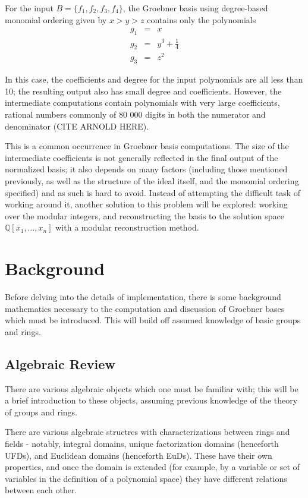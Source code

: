 \documentclass[letterpaper,12pt,titlepage,oneside,final]{book}
\begin{document}
For the input ${B = \{f_1, f_2, f_3, f_4\}}$, the Groebner basis using degree-based monomial ordering given by ${x > y > z}$ contains only the polynomials
\begin{eqnarray*}
  g_1 &=& x\\
  g_2 &=& y^3 + \frac{1}{4}\\ 
  g_3 &=& z^2
\end{eqnarray*} 

In this case, the coefficients and degree for the input polynomials are all less than 10; the resulting output also has small degree and coefficients.  However, the intermediate computations contain polynomials with very large coefficients, rational numbers commonly of 80 000 digits in both the numerator and denominator (CITE ARNOLD HERE).  

This is a common occurrence in Groebner basis computations.  The size of the intermediate coefficients is not generally reflected in the final output of the normalized basis; it also depends on many factors (including those mentioned previously, as well as the structure of the ideal itself, and the monomial ordering specified) and as such is hard to avoid.  Instead of attempting the difficult task of working around it, another solution to this problem will be explored: working over the modular integers, and reconstructing the basis to the solution space ${\mathbb{Q}[x_1, \ldots, x_n]}$ with a modular reconstruction method.



\chapter{Background}\label{chpt:bg}

Before delving into the details of implementation, there is some background mathematics necessary to the computation and discussion of Groebner bases which must be introduced.  This will build off assumed knowledge of basic groups and rings.

\section{Algebraic Review}

There are various algebraic objects which one must be familiar with; this will be a brief introduction to these objects, assuming previous knowledge of the theory of groups and rings.  

There are various algebraic structres with characterizations between rings and fields - notably, integral domains, unique factorization domains (henceforth UFDs), and Euclidean domains (henceforth EuDs).  These have their own properties, and once the domain is extended (for example, by a variable or set of variables in the definition of a polynomial space) they have different relations between each other.  
\end{document}
